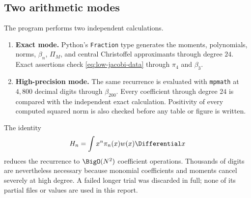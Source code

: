 \documentclass[11pt,oneside]{article}
\theoremstyle{definition}
\theoremstyle{remark}
\numberwithin{equation}{section}
\begin{document}
\subsection{Two arithmetic modes}
The program performs two independent calculations.
\begin{enumerate}
\item \textbf{Exact mode.}  Python's \texttt{Fraction} type generates the
      moments, polynomials, norms, $\beta_n$, $\Pi_M$, and central
      Christoffel approximants through degree $24$.  Exact assertions check
      \cref{eq:low-jacobi-data} through $\pi_4$ and $\beta_3$.
\item \textbf{High-precision mode.}  The same recurrence is evaluated with
      \texttt{mpmath} at $4{,}800$ decimal digits through $\beta_{200}$.
      Every coefficient through degree $24$ is compared with the independent
      exact calculation.  Positivity of every computed squared norm is also
      checked before any table or figure is written.
\end{enumerate}
The identity
\begin{equation}
 H_n=\int x^n\pi_n(x)w(x)\Differential x
 \label{eq:numerical-norm-identity}
\end{equation}
reduces the recurrence to $\BigO(N^2)$ coefficient operations.  Thousands of
digits are nevertheless necessary because monomial coefficients and moments
cancel severely at high degree.  A failed longer trial was discarded in full;
none of its partial files or values are used in this report.
\end{document}
